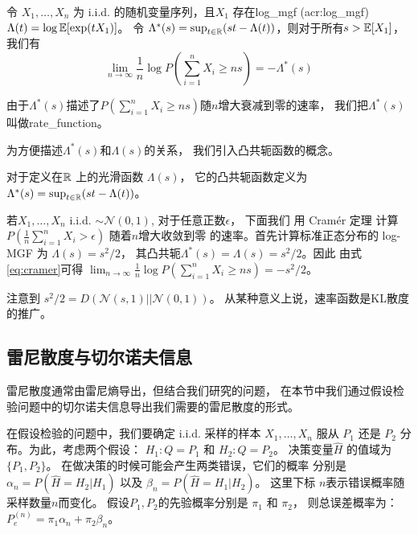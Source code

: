 \begin{theorem}\label{thm:cramer}
  令 $X_1, \dots, X_n$ 为 i.i.d. 的随机变量序列，且$X_1$ 存在\gls{log_mgf} (\gls{acr:log_mgf})
$\Lambda(t)=\log \operatorname{\mathbb{E}}[\exp(t X_1)]$。
令 $\Lambda^*(s)= \sup_{t \in \mathbb{R}} (st-\Lambda(t))$，则对于所有$s>\operatorname{\mathbb{E}}[X_1]$，
我们有
\begin{equation}\label{eq:cramer}
\lim_{n\to \infty} \frac{1}{n}\log P\left(
  \sum_{i=1}^n X_i \geq  ns \right) = - \Lambda^*(s)
\end{equation}
\end{theorem}
由于$\Lambda^*(s)$描述了$P( \sum_{i=1}^n X_i \geq  ns)$随$n$增大衰减到零的速率，
我们把$\Lambda^*(s)$叫做\gls{rate_function}。

为方便描述$\Lambda^*(s)$和$\Lambda(s)$的关系，
我们引入凸共轭函数的概念。
\begin{definition}
  对于定义在$\mathbb{R}$ 上的光滑函数 $\Lambda(s)$，
  它的凸共轭函数定义为
  $\Lambda^*(s) = \sup_{t \in \mathbb{R}} (st-\Lambda(t))$。
\end{definition}

\begin{example}\label{ex:cramer_ldp}
  若$X_1, \dots, X_n$ i.i.d. $\sim \mathcal{N}(0,1)$,
  对于任意正数$\epsilon$，
  下面我们 用  Cramér 定理 计算 $P(\frac{1}{n} \sum_{i=1}^n X_i > \epsilon)$ 
  随着$n$增大收敛到零
  的速率。首先计算标准正态分布的 log-MGF 为 $\Lambda(s)=s^2/2$，
  其凸共轭$\Lambda^*(s)=\Lambda(s)=s^2/2$。因此
  由式\eqref{eq:cramer}可得
  $\lim_{n\to \infty} \frac{1}{n}\log P( \sum_{i=1}^n X_i \geq  ns) =-s^2/2$。
  \end{example}
\begin{remark}
  注意到 $s^2/2=D(\mathcal{N}(s, 1) || \mathcal{N}(0,1))$。
  从某种意义上说，速率函数是KL散度的推广。
\end{remark}
\subsection{雷尼散度与切尔诺夫信息}
雷尼散度\cite{renyi1961measures}通常由雷尼熵导出，但结合我们研究的问题，
在本节中我们通过假设检验问题中的切尔诺夫信息导出我们需要的雷尼散度的形式。

在假设检验的问题中，我们要确定 i.i.d. 采样的样本
$X_1, \dots, X_n$ 服从
$P_1$ 还是 $P_2$ 分布。为此，考虑两个假设：
$H_1: Q=P_1$ 和 $H_2: Q=P_2$。
决策变量$\widehat{H}$ 的值域为 $\{P_1, P_2\}$。
在做决策的时候可能会产生两类错误，它们的概率
分别是 $\alpha_n=P(\widehat{H}=H_2|H_1)$
以及 $\beta_n=P(\widehat{H}=H_1|H_2)$。
这里下标 $n$表示错误概率随采样数量$n$而变化。
假设$P_1, P_2$的先验概率分别是 $\pi_1$ 和 $\pi_2$，
则总误差概率为：$P_e^{(n)} = \pi_1 \alpha_n
+ \pi_2 \beta_n$。

